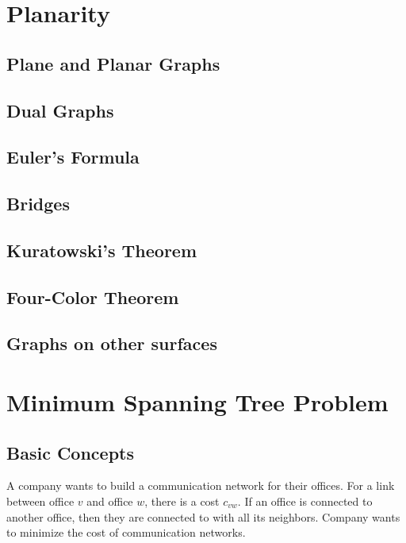 	\chapter{Planarity}
		\section{Plane and Planar Graphs}

		\section{Dual Graphs}

		\section{Euler's Formula}

		\section{Bridges}

		\section{Kuratowski's Theorem}

		\section{Four-Color Theorem}

		\section{Graphs on other surfaces}

	\chapter{Minimum Spanning Tree Problem}
		\section{Basic Concepts}
			\begin{example}
				A company wants to build a communication network for their offices. For a link between office $v$ and office $w$, there is a cost $c_{vw}$. If an office is connected to another office, then they are connected to with all its neighbors. Company wants to minimize the cost of communication networks.
			\end{example}

